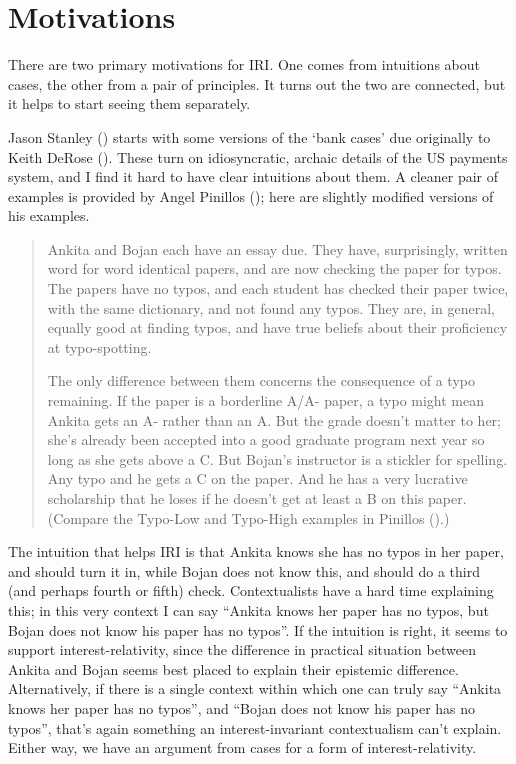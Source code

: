 \documentclass[
  10pt,
  letterpaper,
  DIV=11,
  numbers=noendperiod,
  twoside]{scrartcl}
\begin{document}
\section{Motivations}\label{motivations}

There are two primary motivations for IRI. One comes from intuitions
about cases, the other from a pair of principles. It turns out the two
are connected, but it helps to start seeing them separately.

Jason Stanley () starts with some
versions of the `bank cases' due originally to Keith DeRose
(). These turn on idiosyncratic, archaic
details of the US payments system, and I find it hard to have clear
intuitions about them. A cleaner pair of examples is provided by Angel
Pinillos (); here are slightly modified
versions of his examples.

\begin{quote}
Ankita and Bojan each have an essay due. They have, surprisingly,
written word for word identical papers, and are now checking the paper
for typos. The papers have no typos, and each student has checked their
paper twice, with the same dictionary, and not found any typos. They
are, in general, equally good at finding typos, and have true beliefs
about their proficiency at typo-spotting.

The only difference between them concerns the consequence of a typo
remaining. If the paper is a borderline A/A- paper, a typo might mean
Ankita gets an A- rather than an A. But the grade doesn't matter to her;
she's already been accepted into a good graduate program next year so
long as she gets above a C. But Bojan's instructor is a stickler for
spelling. Any typo and he gets a C on the paper. And he has a very
lucrative scholarship that he loses if he doesn't get at least a B on
this paper. (Compare the Typo-Low and Typo-High examples in Pinillos
().)
\end{quote}

The intuition that helps IRI is that Ankita knows she has no typos in
her paper, and should turn it in, while Bojan does not know this, and
should do a third (and perhaps fourth or fifth) check. Contextualists
have a hard time explaining this; in this very context I can say
``Ankita knows her paper has no typos, but Bojan does not know his paper
has no typos''. If the intuition is right, it seems to support
interest-relativity, since the difference in practical situation between
Ankita and Bojan seems best placed to explain their epistemic
difference. Alternatively, if there is a single context within which one
can truly say ``Ankita knows her paper has no typos'', and ``Bojan does
not know his paper has no typos'', that's again something an
interest-invariant contextualism can't explain. Either way, we have an
argument from cases for a form of interest-relativity.
\end{document}
